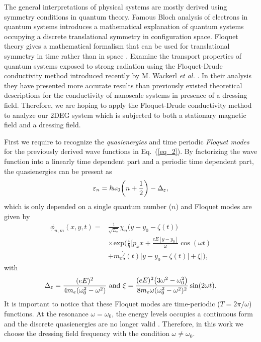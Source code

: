 
The general interpretations of physical systems are mostly derived using symmetry conditions in quantum theory. Famous Bloch analysis of electrons in quantum systems introduces a mathematical explanation of quantum systems occupying a discrete translational symmetry in configuration space. Floquet theory gives a mathematical formalism that can be used for translational symmetry in time rather than in space \cite{floquet83,grifoni98,holthaus15}. Examine the transport properties of quantum systems exposed to strong radiation using the Floquet-Drude conductivity method introduced recently by M. Wackerl \textit{et al.} \cite{wackerl20}. In their analysis they have presented more accurate results than previously existed theoretical descriptions for the conductivity of nanoscale systems in presence of a dressing field. Therefore, we are hoping to apply the Floquet-Drude conductivity method to analyze our 2DEG system which is subjected to both a stationary magnetic field and a dressing field.

First we require to recognize the \textit{quasienergies} and time periodic \textit{Floquet modes} \cite{grifoni98} for the previously derived wave functions in Eq.~(\ref{eq_2}). By factorizing the wave function into a linearly time dependent part and a periodic time dependent part, the quasienergies can be present as
\begin{equation} \label{eq_6}
  \varepsilon_{n} =
  \hbar \omega_0\qty(n + \frac{1}{2}) - \Delta_{\varepsilon},
\end{equation}
which is only depended on a single quantum number ($n$) and Floquet modes are given by
\begin{equation} \label{eq_7}
  \begin{aligned}
    \phi_{n,m}(x,y,t) = &
    \frac{1}{\sqrt{L_x}} \chi_{n}\big(y - y_0 - \zeta(t)\big)\\
    & \times
    \text{exp}\bigg(
     \frac{i}{\hbar}\bigg[
     p_x x +
     \frac{eE[y - y_0]}{\omega}\cos(\omega t) \\
     & +
     m_e\dot{\zeta}(t)\big[y - y_0 -\zeta(t)\big]
     + \xi \bigg]\bigg),
  \end{aligned}
\end{equation}
with
\begin{equation} \label{eq_8}
  \Delta_{\varepsilon} = \frac{(eE)^2}{4m_e(\omega_0^2 - \omega^2)} ~ \text{and} ~
  \xi = \frac{(eE)^2\qty(3\omega^2 - \omega_0^2)}{8m_e\omega(\omega_0^2 - \omega^2)^2} \sin(2\omega t).
\end{equation}
It is important to notice that these Floquet modes are time-periodic ($T=2\pi/\omega$) functions. At the resonance $\omega = \omega_0$, the energy levels occupies a continuous form and the discrete quasienergies are no longer valid \cite{popov70}. Therefore, in this work we choose the dressing field frequency with the condition $\omega \neq \omega_0$.

